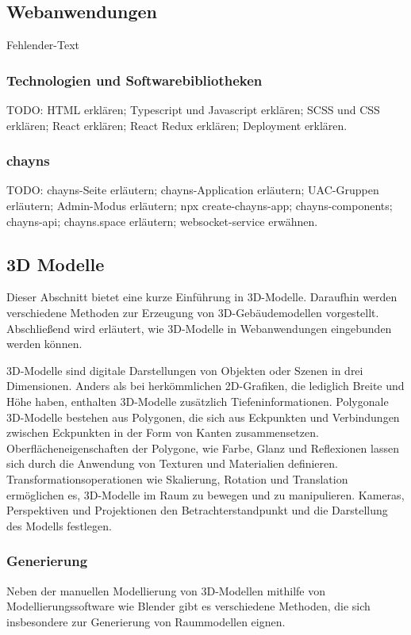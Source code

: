 \subsection{Webanwendungen}
Fehlender-Text

\subsubsection{Technologien und Softwarebibliotheken}\label{sec:WebTechnologies}
TODO: HTML erklären; Typescript und Javascript erklären; SCSS und CSS erklären; React erklären; React Redux erklären; Deployment erklären.

\subsubsection{chayns}\label{sec:Chayns}
TODO: chayns-Seite erläutern; chayns-Application erläutern; UAC-Gruppen erläutern; Admin-Modus erläutern; npx create-chayns-app; chayns-components; chayns-api; chayns.space erläutern; websocket-service erwähnen.

\subsection{3D Modelle}
Dieser Abschnitt bietet eine kurze Einführung in 3D-Modelle. Daraufhin werden verschiedene Methoden zur Erzeugung von 3D-Gebäudemodellen vorgestellt. Abschließend wird erläutert, wie 3D-Modelle in Webanwendungen eingebunden werden können.

3D-Modelle sind digitale Darstellungen von Objekten oder Szenen in drei Dimensionen. Anders als bei herkömmlichen 2D-Grafiken, die lediglich Breite und Höhe haben, enthalten 3D-Modelle zusätzlich Tiefeninformationen. Polygonale 3D-Modelle bestehen aus Polygonen, die sich aus Eckpunkten und Verbindungen zwischen Eckpunkten in der Form von Kanten zusammensetzen. Oberflächeneigenschaften der Polygone, wie Farbe, Glanz und Reflexionen lassen sich durch die Anwendung von Texturen und Materialien definieren. Transformationsoperationen wie Skalierung, Rotation und Translation ermöglichen es, 3D-Modelle im Raum zu bewegen und zu manipulieren. Kameras, Perspektiven und Projektionen den Betrachterstandpunkt und die Darstellung des Modells festlegen.\cite[S.~8-16]{Parisi2014}

\subsubsection{Generierung}
Neben der manuellen Modellierung von 3D-Modellen mithilfe von Modellierungssoftware wie Blender gibt es verschiedene Methoden, die sich insbesondere zur Generierung von Raummodellen eignen.

